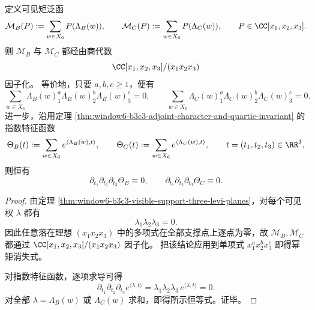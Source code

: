 \begin{proposition}[三轴选择律与指数特征函数的三阶湮灭]\label{prop:window6-b3c3-triaxial-selection-ideal-factorization}
定义可见矩泛函
\[
\mathcal M_B(P):=\sum_{w\in X_6}P(\Lambda_B(w)),
\qquad
\mathcal M_C(P):=\sum_{w\in X_6}P(\Lambda_C(w)),
\qquad
P\in \CC[x_1,x_2,x_3].
\]
则 \(\mathcal M_B\) 与 \(\mathcal M_C\) 都经由商代数
\[
\CC[x_1,x_2,x_3]/(x_1x_2x_3)
\]
因子化。
等价地，只要 \(a,b,c\ge 1\)，便有
\[
\sum_{w\in X_6}\Lambda_B(w)_1^a\Lambda_B(w)_2^b\Lambda_B(w)_3^c=0,
\qquad
\sum_{w\in X_6}\Lambda_C(w)_1^a\Lambda_C(w)_2^b\Lambda_C(w)_3^c=0.
\]
进一步，沿用定理 \ref{thm:window6-b3c3-adjoint-character-and-quartic-invariant} 的指数特征函数
\[
\Theta_B(t):=\sum_{w\in X_6}e^{\langle \Lambda_B(w),t\rangle},
\qquad
\Theta_C(t):=\sum_{w\in X_6}e^{\langle \Lambda_C(w),t\rangle},
\qquad
t=(t_1,t_2,t_3)\in \RR^3,
\]
则恒有
\[
\partial_{t_1}\partial_{t_2}\partial_{t_3}\Theta_B\equiv 0,
\qquad
\partial_{t_1}\partial_{t_2}\partial_{t_3}\Theta_C\equiv 0.
\]
\end{proposition}
\begin{proof}
由定理 \ref{thm:window6-b3c3-visible-support-three-levi-planes}，对每个可见权 \(\lambda\) 都有
\[
\lambda_1\lambda_2\lambda_3=0.
\]
因此任意落在理想 \((x_1x_2x_3)\) 中的多项式在全部支撑点上逐点为零，故 \(\mathcal M_B,\mathcal M_C\) 都通过
\(
\CC[x_1,x_2,x_3]/(x_1x_2x_3)
\)
因子化。
把该结论应用到单项式 \(x_1^a x_2^b x_3^c\) 即得幂矩消失式。

对指数特征函数，逐项求导可得
\[
\partial_{t_1}\partial_{t_2}\partial_{t_3}
e^{\langle \lambda,t\rangle}
=
\lambda_1\lambda_2\lambda_3\,e^{\langle \lambda,t\rangle}
=
0.
\]
对全部 \(\lambda=\Lambda_B(w)\) 或 \(\Lambda_C(w)\) 求和，即得所示恒等式。证毕。
\end{proof}

